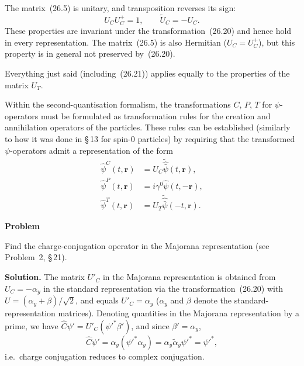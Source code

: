 The matrix~(26.5) is unitary, and transposition reverses its sign:
\begin{equation}
U_CU^+_C = 1,\qquad \widetilde U_C = -U_C.
\tag{26.21}
\end{equation}
These properties are invariant under the transformation~(26.20) and hence hold in every representation. The matrix~(26.5) is also Hermitian ($U_C = U^+_C$), but this property is in general not preserved by~(26.20).

Everything just said (including~(26.21)) applies equally to the properties of the matrix $U_T$.

Within the second-quantisation formalism, the transformations $C$, $P$, $T$ for $\psi$-operators must be formulated as transformation rules for the creation and annihilation operators of the particles. These rules can be established (similarly to how it was done in \S\,13 for spin-0 particles) by requiring that the transformed $\psi$-operators admit a representation of the form
\begin{equation}
\begin{aligned}
\widehat\psi^C(t,\mathbf{r}) &= U_C\widetilde{\widehat{\bar\psi}}(t,\mathbf{r}),\\
\widehat\psi^P(t,\mathbf{r}) &= i\gamma^0\widehat\psi(t,-\mathbf{r}),\\
\widehat\psi^T(t,\mathbf{r}) &= U_T\widetilde{\widehat{\bar\psi}}(-t,\mathbf{r}).
\end{aligned}
\tag{26.22}
\end{equation}

\begin{center}
\textbf{Problem}
\end{center}

Find the charge-conjugation operator in the Majorana representation (see Problem~2, \S\,21).

\textbf{Solution.} The matrix $U'_C$ in the Majorana representation is obtained from $U_C = -\alpha_y$ in the standard representation via the transformation~(26.20) with $U = (\alpha_y + \beta)/\sqrt{2}$, and equals $U'_C = \alpha_y$ ($\alpha_y$ and $\beta$ denote the standard-representation matrices). Denoting quantities in the Majorana representation by a prime, we have $\widehat C\psi' = U'_C(\psi'^*\beta')$, and since $\beta' = \alpha_y$,
\[
\widehat C\psi' = \alpha_y(\psi'^*\alpha_y) = \alpha_y\widetilde\alpha_y\psi'^* = \psi'^*,
\]
i.e.\ charge conjugation reduces to complex conjugation.
